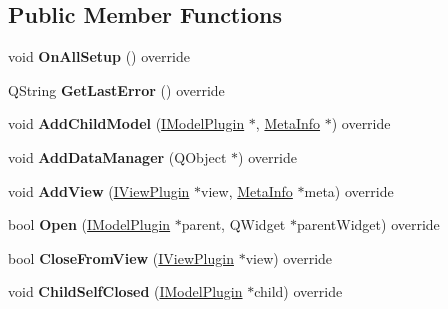 \subsection*{Public Member Functions}
\begin{DoxyCompactItemize}
\item 
\mbox{\label{class_task_sketch_model_af1c56b3d144468266b5c82297b83852f}} 
void {\bfseries On\+All\+Setup} () override
\item 
\mbox{\label{class_task_sketch_model_a683fcebcaa91cce32a9dbdde28ea249f}} 
Q\+String {\bfseries Get\+Last\+Error} () override
\item 
\mbox{\label{class_task_sketch_model_a3a87e79c34a0e67bf1027fffedb43bc4}} 
void {\bfseries Add\+Child\+Model} (\hyperlink{class_i_model_plugin}{I\+Model\+Plugin} $\ast$, \hyperlink{struct_meta_info}{Meta\+Info} $\ast$) override
\item 
\mbox{\label{class_task_sketch_model_aa5239531a2b064abdb3c06efbe544c38}} 
void {\bfseries Add\+Data\+Manager} (Q\+Object $\ast$) override
\item 
\mbox{\label{class_task_sketch_model_a7febb27374b155e86d33543adc350c36}} 
void {\bfseries Add\+View} (\hyperlink{class_i_view_plugin}{I\+View\+Plugin} $\ast$view, \hyperlink{struct_meta_info}{Meta\+Info} $\ast$meta) override
\item 
\mbox{\label{class_task_sketch_model_ace37e6001318e699bdd1a1412628ea90}} 
bool {\bfseries Open} (\hyperlink{class_i_model_plugin}{I\+Model\+Plugin} $\ast$parent, Q\+Widget $\ast$parent\+Widget) override
\item 
\mbox{\label{class_task_sketch_model_a32efbd8dbe71476b9ea223f330ff6cc8}} 
bool {\bfseries Close\+From\+View} (\hyperlink{class_i_view_plugin}{I\+View\+Plugin} $\ast$view) override
\item 
\mbox{\label{class_task_sketch_model_ab64b7d0896769163fb7cb5c786c67efe}} 
void {\bfseries Child\+Self\+Closed} (\hyperlink{class_i_model_plugin}{I\+Model\+Plugin} $\ast$child) override

\end{DoxyCompactItemize}
